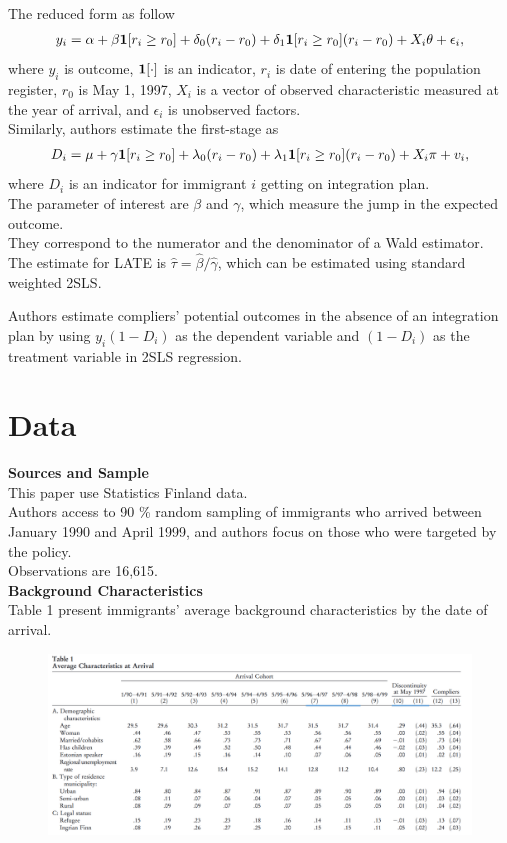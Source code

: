 \documentclass[../root]{subfiles}
\begin{document}
    The reduced form as follow
    \begin{align*}
        y_i = \alpha +\beta {\bf1}[r_i \geq r_0] + \delta_0(r_i- r_0) + \delta_1 {\bf1}[r_i \geq r_0] (r_i- r_0) +X_i \theta + \epsilon_i, 
    \end{align*}
    where $y_i$ is outcome, ${\bf 1}[\cdot]$ is an indicator, $r_i$ is date of entering the population register, $r_0$ is May 1, 1997, $X_i$ is a vector of observed characteristic measured at the year of arrival, and $\epsilon_i$ is unobserved factors.  \\
    
    Similarly, authors estimate the first-stage as 
    \begin{align*}
        D_i = \mu + \gamma {\bf 1}[r_i \geq r_0] + \lambda_0(r_i - r_0)  +\lambda_1 {\bf 1}[r_i \geq r_0](r_i - r_0) +X_i \pi + v_i,
    \end{align*}
    where $D_i$ is an indicator for immigrant $i$ getting on integration plan. \\
    The parameter of interest are $\beta$ and $\gamma$, which measure the jump in the expected outcome.　\\
    They correspond to the numerator and the denominator of a Wald estimator.
    The estimate for LATE is $\hat{\tau} =\hat{\beta}/\hat{\gamma} $, which can be estimated using standard weighted 2SLS.
     
     Authors estimate compliers' potential outcomes in the absence of an integration plan by using $y_i(1-D_i)$ as the dependent variable and $(1-D_i)$ as the treatment variable in 2SLS regression.
    \section{Data}
    {\bf Sources and Sample} \\
    This paper use Statistics Finland data. \\
    Authors access to 90 \% random sampling of immigrants who arrived between January 1990 and April 1999, and authors focus on those who were targeted by the policy. \\
    Observations are 16,615.\\
    
    {\bf Background Characteristics} \\
    Table 1 present immigrants' average background characteristics by the date of arrival.
    
    \begin{figure}[h]
        \includegraphics[width=14cm]{0703sugiyama/Table11.png}
    \end{figure}
    
\end{document}

